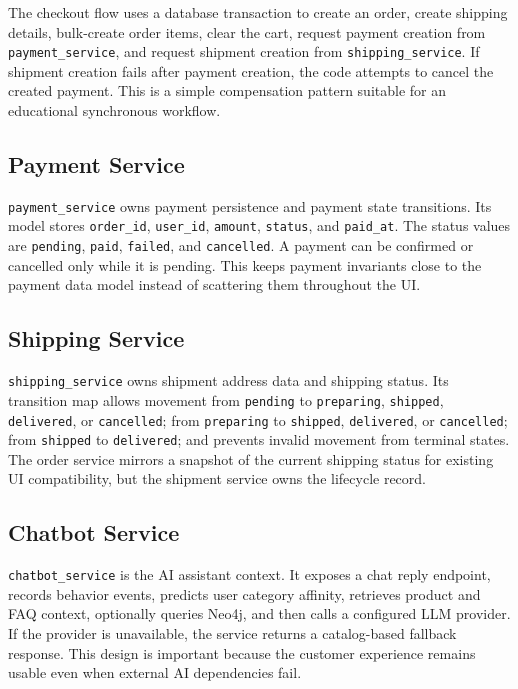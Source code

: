 \documentclass[12pt,a4paper]{article}
\begin{document}
The checkout flow uses a database transaction to create an order, create shipping details, bulk-create order items, clear the cart, request payment creation from \texttt{payment\_service}, and request shipment creation from \texttt{shipping\_service}. If shipment creation fails after payment creation, the code attempts to cancel the created payment. This is a simple compensation pattern suitable for an educational synchronous workflow.

\subsection{Payment Service}

\texttt{payment\_service} owns payment persistence and payment state transitions. Its model stores \texttt{order\_id}, \texttt{user\_id}, \texttt{amount}, \texttt{status}, and \texttt{paid\_at}. The status values are \texttt{pending}, \texttt{paid}, \texttt{failed}, and \texttt{cancelled}. A payment can be confirmed or cancelled only while it is pending. This keeps payment invariants close to the payment data model instead of scattering them throughout the UI.

\subsection{Shipping Service}

\texttt{shipping\_service} owns shipment address data and shipping status. Its transition map allows movement from \texttt{pending} to \texttt{preparing}, \texttt{shipped}, \texttt{delivered}, or \texttt{cancelled}; from \texttt{preparing} to \texttt{shipped}, \texttt{delivered}, or \texttt{cancelled}; from \texttt{shipped} to \texttt{delivered}; and prevents invalid movement from terminal states. The order service mirrors a snapshot of the current shipping status for existing UI compatibility, but the shipment service owns the lifecycle record.

\subsection{Chatbot Service}

\texttt{chatbot\_service} is the AI assistant context. It exposes a chat reply endpoint, records behavior events, predicts user category affinity, retrieves product and FAQ context, optionally queries Neo4j, and then calls a configured LLM provider. If the provider is unavailable, the service returns a catalog-based fallback response. This design is important because the customer experience remains usable even when external AI dependencies fail.
\end{document}
